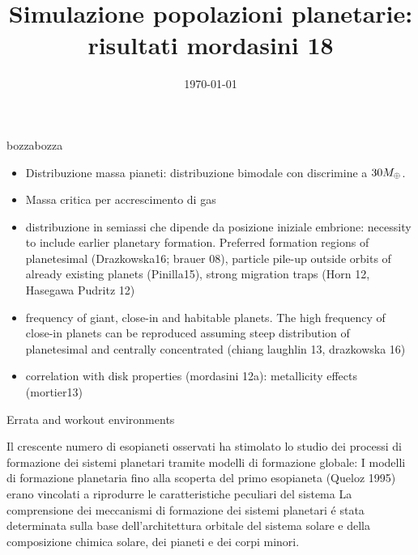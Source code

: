 \documentclass[twoside,11pt,fleqn]{memoir}%
\author{ }
\title{Simulazione popolazioni planetarie: risultati mordasini 18}
\date{\today}
\def\versione{bozza}%
\def\bozza{bozza}
\begin{document}
	\ifx\versione\bozza
	\woc
	\fi
\maketitle
\begin{workout}
\begin{itemize}
\item Distribuzione massa pianeti: distribuzione bimodale con discrimine a $30M_{\oplus}{}$.
\item Massa critica per accrescimento di gas
\item distribuzione in semiassi che dipende da posizione iniziale embrione: necessity to include earlier planetary formation.  Preferred formation regions of planetesimal (Drazkowska16; brauer 08), particle pile-up outside orbits of already existing planets (Pinilla15), strong migration traps (Horn 12, Hasegawa Pudritz 12)
\item frequency of giant, close-in and habitable planets. The high frequency of close-in planets can be reproduced assuming steep distribution of planetesimal and centrally concentrated (chiang laughlin 13, drazkowska 16)
\item correlation with disk properties (mordasini 12a): metallicity effects (mortier13)
\end{itemize}
\end{workout}
\tableofcontents*
\mainmatter
{}
\cleartorecto
\begin{workout}
Errata and workout environments
\end{workout}
\begin{errata}
Il crescente numero di esopianeti osservati ha stimolato lo studio dei processi di formazione dei sistemi planetari tramite modelli di formazione globale: 
I modelli di formazione planetaria fino alla scoperta del primo esopianeta (Queloz 1995) erano vincolati a riprodurre le caratteristiche peculiari del sistema
La comprensione dei meccanismi di formazione dei sistemi planetari \'e stata determinata sulla base dell'architettura orbitale del sistema solare e della composizione chimica solare, dei pianeti e dei corpi minori.
\end{errata}
\end{document}
